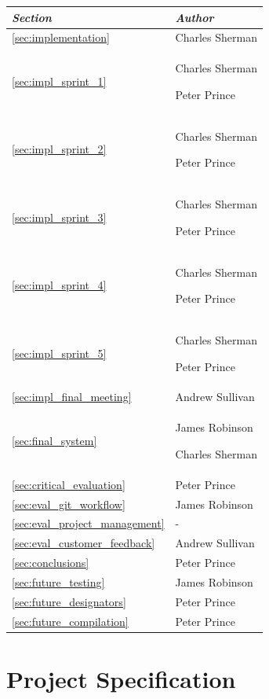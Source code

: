 \documentclass[a4paper, 12pt, twoside]{article}
\newcommand*{\fullref}[1]{\ref{#1} \nameref{#1}}
\begin{document}
\begin{tabularx}{\textwidth}{|X|X|} \hline
  \emph{Section}                         & \emph{Author}                      \\ \hline
  \fullref{sec:implementation}           & Charles Sherman                    \\
  \fullref{sec:impl_sprint_1}            & Charles Sherman\par Peter Prince   \\
  \fullref{sec:impl_sprint_2}            & Charles Sherman\par Peter Prince   \\
  \fullref{sec:impl_sprint_3}            & Charles Sherman\par Peter Prince   \\
  \fullref{sec:impl_sprint_4}            & Charles Sherman\par Peter Prince   \\
  \fullref{sec:impl_sprint_5}            & Charles Sherman\par Peter Prince   \\
  \fullref{sec:impl_final_meeting}       & Andrew Sullivan   \\ \hline
  \fullref{sec:final_system}             & James Robinson\par Charles Sherman \\ \hline
  \fullref{sec:critical_evaluation}        & Peter Prince                     \\
  \fullref{sec:eval_git_workflow}        & James Robinson                     \\
  \fullref{sec:eval_project_management}  & -                                  \\
  \fullref{sec:eval_customer_feedback}  & Andrew Sullivan  \\ \hline
  \fullref{sec:conclusions}              & Peter Prince                       \\ \hline
  \fullref{sec:future_testing}           & James Robinson                     \\
  \fullref{sec:future_designators}       & Peter Prince                       \\
  \fullref{sec:future_compilation}       & Peter Prince                       \\ \hline
\end{tabularx}

\section{Project Specification}
\end{document}
